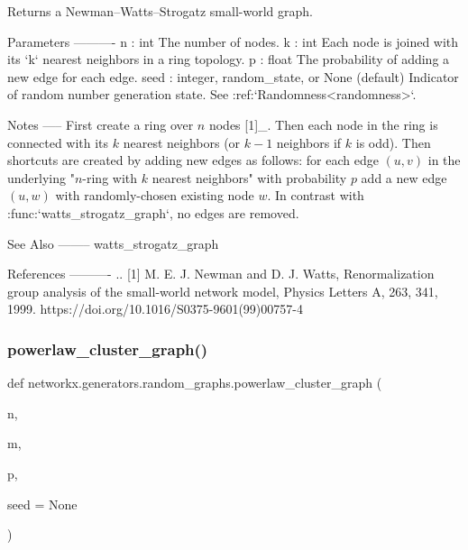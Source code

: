 \begin{DoxyVerb}Returns a Newman–Watts–Strogatz small-world graph.

Parameters
----------
n : int
    The number of nodes.
k : int
    Each node is joined with its `k` nearest neighbors in a ring
    topology.
p : float
    The probability of adding a new edge for each edge.
seed : integer, random_state, or None (default)
    Indicator of random number generation state.
    See :ref:`Randomness<randomness>`.

Notes
-----
First create a ring over $n$ nodes [1]_.  Then each node in the ring is
connected with its $k$ nearest neighbors (or $k - 1$ neighbors if $k$
is odd).  Then shortcuts are created by adding new edges as follows: for
each edge $(u, v)$ in the underlying "$n$-ring with $k$ nearest
neighbors" with probability $p$ add a new edge $(u, w)$ with
randomly-chosen existing node $w$.  In contrast with
:func:`watts_strogatz_graph`, no edges are removed.

See Also
--------
watts_strogatz_graph

References
----------
.. [1] M. E. J. Newman and D. J. Watts,
   Renormalization group analysis of the small-world network model,
   Physics Letters A, 263, 341, 1999.
   https://doi.org/10.1016/S0375-9601(99)00757-4
\end{DoxyVerb}
 \mbox{\label{namespacenetworkx_1_1generators_1_1random__graphs_a19a5fada577037fdba365f25342966d0}} 
\subsubsection{\texorpdfstring{powerlaw\+\_\+cluster\+\_\+graph()}{powerlaw\_cluster\_graph()}}
{\footnotesize\ttfamily def networkx.\+generators.\+random\+\_\+graphs.\+powerlaw\+\_\+cluster\+\_\+graph (\begin{DoxyParamCaption}\item[{}]{n,  }\item[{}]{m,  }\item[{}]{p,  }\item[{}]{seed = {\ttfamily None} }\end{DoxyParamCaption})}

